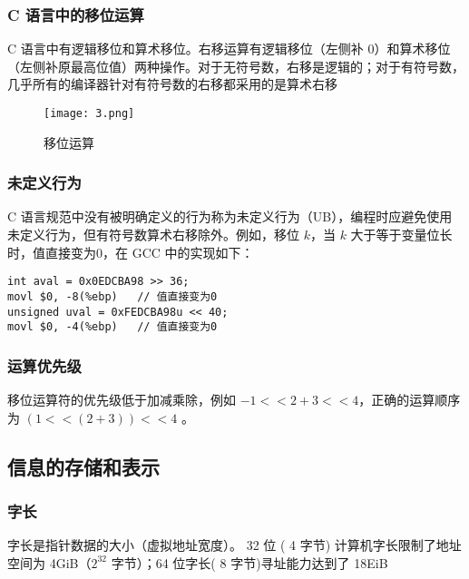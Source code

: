 \subsubsection{C 语言中的移位运算}
C 语言中有逻辑移位和算术移位。右移运算有逻辑移位（左侧补 0）和算术移位（左侧补原最高位值）两种操作。对于无符号数，右移是逻辑的；对于有符号数，几乎所有的编译器针对有符号数的右移都采用的是算术右移
\begin{figure}[H]
    \centering
    \captionsetup{skip=4pt}
    \texttt{[image: 3.png]}
    \caption{移位运算}
\end{figure}
\subsubsection{未定义行为}
C 语言规范中没有被明确定义的行为称为未定义行为（UB），编程时应避免使用未定义行为，但有符号数算术右移除外。例如，移位 \(k\)，当 \(k\) 大于等于变量位长时，值直接变为0，在 GCC 中的实现如下：
\begin{verbatim}
int aval = 0x0EDCBA98 >> 36; 
movl $0, -8(%ebp)   // 值直接变为0
unsigned uval = 0xFEDCBA98u << 40;
movl $0, -4(%ebp)   // 值直接变为0
\end{verbatim}
\subsubsection{运算优先级}
移位运算符的优先级低于加减乘除，例如 \(- 1<<2+3<<4\)，正确的运算顺序为 \((1<<(2 + 3))<<4\) 。
\subsection{信息的存储和表示}
\subsubsection{字长}
字长是指针数据的大小（虚拟地址宽度）。 32 位 ( 4 字节) 计算机字长限制了地址空间为 4GiB（\(2^{32}\) 字节）；64 位字长( 8 字节)寻址能力达到了 18EiB
